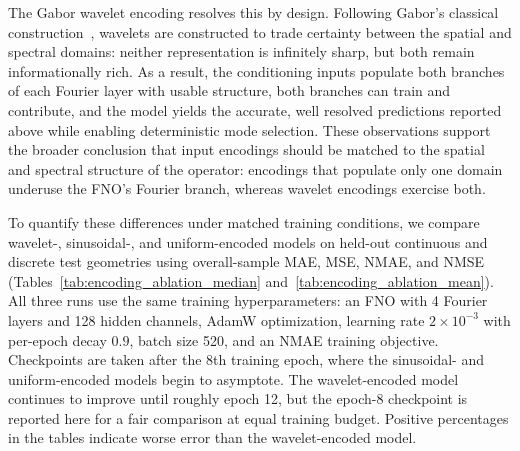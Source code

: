\documentclass[preprint,review,12pt,numafflabel]{elsarticle}
\begin{document}
The Gabor wavelet encoding resolves this by design. Following Gabor's classical construction~\cite{gabor1946theory}, wavelets are constructed to trade certainty between the spatial and spectral domains: neither representation is infinitely sharp, but both remain informationally rich. As a result, the conditioning inputs populate both branches of each Fourier layer with usable structure, both branches can train and contribute, and the model yields the accurate, well resolved predictions reported above while enabling deterministic mode selection. These observations support the broader conclusion that input encodings should be matched to the spatial and spectral structure of the operator: encodings that populate only one domain underuse the FNO's Fourier branch, whereas wavelet encodings exercise both.

To quantify these differences under matched training conditions, we compare wavelet-, sinusoidal-, and uniform-encoded models on held-out continuous and discrete test geometries using overall-sample MAE, MSE, NMAE, and NMSE (Tables~\ref{tab:encoding_ablation_median} and~\ref{tab:encoding_ablation_mean}). All three runs use the same training hyperparameters: an FNO with 4 Fourier layers and 128 hidden channels, AdamW optimization, learning rate $2\times10^{-3}$ with per-epoch decay $0.9$, batch size 520, and an NMAE training objective. Checkpoints are taken after the 8th training epoch, where the sinusoidal- and uniform-encoded models begin to asymptote. The wavelet-encoded model continues to improve until roughly epoch 12, but the epoch-8 checkpoint is reported here for a fair comparison at equal training budget. Positive percentages in the tables indicate worse error than the wavelet-encoded model.
\end{document}
